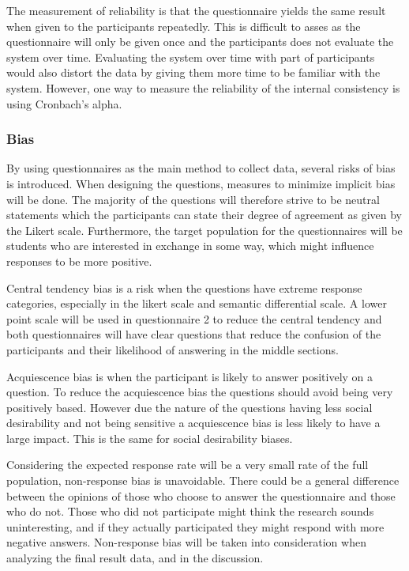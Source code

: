 The measurement of reliability is that the questionnaire yields the same result when given to the participants repeatedly. This is difficult to asses as the questionnaire will only be given once and the participants does not evaluate the system over time. Evaluating the system over time with part of participants would also distort the data by giving them more time to be familiar with the system. However, one way to measure the reliability of the internal consistency is using Cronbach's alpha.\cite{bland1997statistics}

\subsubsection{Bias}

By using questionnaires as the main method to collect data, several risks of bias is introduced. When designing the questions, measures to minimize implicit bias will be done. The majority of the questions will therefore strive to be neutral statements which the participants can state their degree of agreement as given by the Likert scale\cite{allen2007likert}. Furthermore, the target population for the questionnaires will be students who are interested in exchange in some way, which might influence responses to be more positive. 

Central tendency bias is a risk when the questions have extreme response categories, especially in the likert scale and semantic differential scale. A lower point scale will be used in questionnaire 2 to reduce the central tendency and both questionnaires will have clear questions that reduce the confusion of the participants and their likelihood of answering in the middle sections. 

Acquiescence bias is when the participant is likely to answer positively on a question.\cite{cronbach1946response} To reduce the acquiescence bias the questions should avoid being very positively based. However due the nature of the questions having less social desirability and not being sensitive a acquiescence bias is less likely to have a large impact. This is the same for social desirability biases.  

Considering the expected response rate will be a very small rate of the full population, non-response bias is unavoidable. There could be a general difference between the opinions of those who choose to answer the questionnaire and those who do not. Those who did not participate might think the research sounds uninteresting, and if they actually participated they might respond with more negative answers. Non-response bias will be taken into consideration when analyzing the final result data, and in the discussion.



